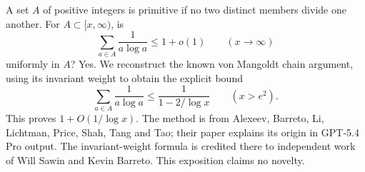 A set $A$ of positive integers is primitive if no two distinct members divide one another. For $A\subset[x,\infty)$, is
\[
 \sum_{a\in A}\frac1{a\log a}\le1+o(1)\qquad(x\to\infty)
\]
uniformly in $A$? Yes. We reconstruct the known von Mangoldt chain argument, using its invariant weight to obtain the explicit bound
\[
 \sum_{a\in A}\frac1{a\log a}\le\frac1{1-2/\log x}\qquad(x>e^2). \tag{1}
\]
This proves $1+O(1/\log x)$. The method is from Alexeev, Barreto, Li, Lichtman, Price, Shah, Tang and Tao; their paper explains its origin in GPT-5.4 Pro output. The invariant-weight formula is credited there to independent work of Will Sawin and Kevin Barreto. This exposition claims no novelty.
